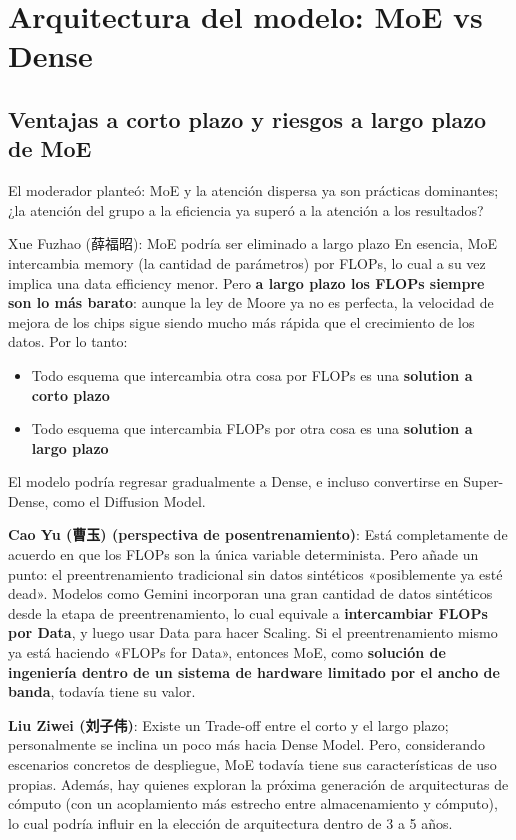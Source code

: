 \section{Arquitectura del modelo: MoE vs Dense}

\subsection{Ventajas a corto plazo y riesgos a largo plazo de MoE}

El moderador planteó: MoE y la atención dispersa ya son prácticas dominantes; ¿la atención del grupo a la eficiencia ya superó a la atención a los resultados?

\begin{importantbox}{Xue Fuzhao (薛福昭): MoE podría ser eliminado a largo plazo}
En esencia, MoE intercambia memory (la cantidad de parámetros) por FLOPs, lo cual a su vez implica una data efficiency menor. Pero \textbf{a largo plazo los FLOPs siempre son lo más barato}: aunque la ley de Moore ya no es perfecta, la velocidad de mejora de los chips sigue siendo mucho más rápida que el crecimiento de los datos. Por lo tanto:
\begin{itemize}
  \item Todo esquema que intercambia otra cosa por FLOPs es una \textbf{solution a corto plazo}
  \item Todo esquema que intercambia FLOPs por otra cosa es una \textbf{solution a largo plazo}
\end{itemize}
El modelo podría regresar gradualmente a Dense, e incluso convertirse en Super-Dense, como el Diffusion Model.
\end{importantbox}

\textbf{Cao Yu (曹玉) (perspectiva de posentrenamiento)}: Está completamente de acuerdo en que los FLOPs son la única variable determinista. Pero añade un punto: el preentrenamiento tradicional sin datos sintéticos «posiblemente ya esté dead». Modelos como Gemini incorporan una gran cantidad de datos sintéticos desde la etapa de preentrenamiento, lo cual equivale a \textbf{intercambiar FLOPs por Data}, y luego usar Data para hacer Scaling. Si el preentrenamiento mismo ya está haciendo «FLOPs for Data», entonces MoE, como \textbf{solución de ingeniería dentro de un sistema de hardware limitado por el ancho de banda}, todavía tiene su valor.

\textbf{Liu Ziwei (刘子伟)}: Existe un Trade-off entre el corto y el largo plazo; personalmente se inclina un poco más hacia Dense Model. Pero, considerando escenarios concretos de despliegue, MoE todavía tiene sus características de uso propias. Además, hay quienes exploran la próxima generación de arquitecturas de cómputo (con un acoplamiento más estrecho entre almacenamiento y cómputo), lo cual podría influir en la elección de arquitectura dentro de 3 a 5 años.

